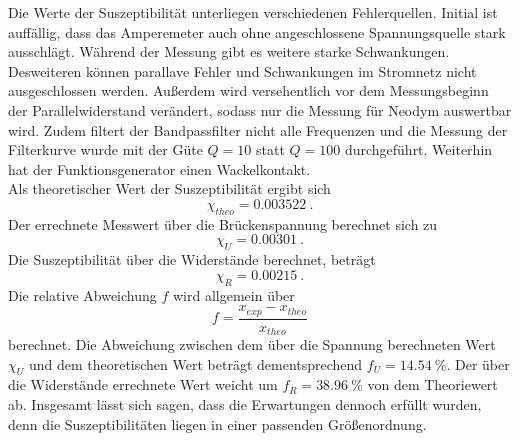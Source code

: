 Die Werte der Suszeptibilität unterliegen verschiedenen Fehlerquellen.
Initial ist auffällig, dass das Amperemeter auch ohne angeschlossene Spannungsquelle stark ausschlägt.
Während der Messung gibt es weitere starke Schwankungen.
Desweiteren können parallave Fehler und Schwankungen im Stromnetz nicht ausgeschlossen werden.
Außerdem wird versehentlich vor dem Messungsbeginn der Parallelwiderstand verändert, sodass nur die Messung für Neodym auswertbar wird.
Zudem filtert der Bandpassfilter nicht alle Frequenzen und die Messung der Filterkurve wurde mit der Güte $Q=10$ statt $Q=100$ durchgeführt.
Weiterhin hat der Funktionsgenerator einen Wackelkontakt.
\\Als theoretischer Wert der Suszeptibilität ergibt sich
\begin{equation*}
  \chi_{theo}=\SI{0.003522}{}.
\end{equation*}
Der errechnete Messwert über die Brückenspannung berechnet sich zu
\begin{equation*}
  \chi_{U}=\SI{0.00301}{}.
\end{equation*}
Die Suszeptibilität über die Widerstände berechnet, beträgt
\begin{equation*}
  \chi_{R}=\SI{0.00215}{}.
\end{equation*}
Die relative Abweichung $f$ wird allgemein über
\begin{equation*}
  f=\frac{x_{exp}-x_{theo}}{x_{theo}}
\end{equation*}
berechnet.
Die Abweichung zwischen dem über die Spannung berechneten Wert $\chi_{U}$ und dem theoretischen Wert beträgt dementsprechend $f_{U}=\SI{14.54}{\%}$.
Der über die Widerstände errechnete Wert weicht um $f_{R}=\SI{38.96}{\%}$ von dem Theoriewert ab.
Insgesamt lässt sich sagen, dass die Erwartungen dennoch erfüllt wurden, denn die Suszeptibilitäten liegen in einer passenden Größenordnung.
